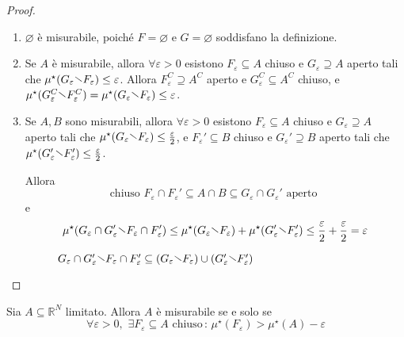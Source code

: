 \begin{proof}
\begin{enumerate}[label = \arabic*.]
    \item \(\varnothing\) è misurabile, poiché \(F = \varnothing\) e \(G =
        \varnothing\) soddisfano la definizione.
    \item Se \(A\) è misurabile, allora \(\forall \varepsilon >0\) esistono \(F_{\varepsilon} \subseteq A
        \) chiuso e \(G_{\varepsilon} \supseteq A \) aperto tali che
        \(\mu^\star(G_{\varepsilon} \sminus F_{\varepsilon}) \le \varepsilon\).
        Allora \(F_{\varepsilon}^{C} \supseteq  A^{C} \) aperto e \(G_{\varepsilon}^{C}
        \subseteq A^{C} \) chiuso, e \(\mu^\star(G_{\varepsilon}^{C} \sminus
        F_{\varepsilon}^{C}) = \mu^\star(G_{\varepsilon} \sminus
        F_{\varepsilon}) \le \varepsilon\).
    \item Se \(A, B\) sono misurabili, allora \(\forall \varepsilon > 0\)
        esistono \(F_{\varepsilon} \subseteq A \) chiuso e \(G_{\varepsilon}
        \supseteq A \) aperto tali che \(\mu^\star(G_{\varepsilon} \sminus
        F_{\varepsilon}) \le \frac{\varepsilon}{2}\), e \(F_{\varepsilon}' \subseteq B \)
        chiuso e \(G_{\varepsilon}' \supseteq B \) aperto tali che
        \(\mu^\star(G_{\varepsilon}' \sminus F_{\varepsilon}') \le
        \frac{\varepsilon}{2}\).

        Allora
        \[
            \text{chiuso } F_\varepsilon \cap F_\varepsilon' \subseteq A \cap B \subseteq
            G_\varepsilon \cap G_\varepsilon' \text{ aperto }
        \]
        e
        \[
            \mu^\star(G_\varepsilon \cap G_\varepsilon' \sminus F_\varepsilon \cap F_\varepsilon') \le
            \mu^\star(G_\varepsilon \sminus F_\varepsilon) + \mu^\star(G_\varepsilon' \sminus F_\varepsilon') \le
            \frac{\varepsilon}{2} + \frac{\varepsilon}{2} = \varepsilon
        \]
\begin{figure}[ht]
    \centering
    \caption{\(G_\varepsilon \cap G_\varepsilon' \sminus F_\varepsilon \cap
    F_\varepsilon' \subseteq (G_\varepsilon \sminus F_\varepsilon) \cup
(G_\varepsilon' \sminus F_\varepsilon') \) }\label{fig:weird_intersection}
\end{figure}

\end{enumerate}
\end{proof}
\begin{proposition}\label{prop:prop_5}
    Sia \(A\subseteq \mathbb{R}^{N} \) limitato. Allora \(A\) è misurabile se e
    solo se \[\forall \varepsilon > 0, \,\, \exists F_\varepsilon \subseteq A \, \, 
    \text{chiuso} \,: \, \mu^\star(F_\varepsilon) > \mu^\star(A) - \varepsilon\]
\end{proposition}
